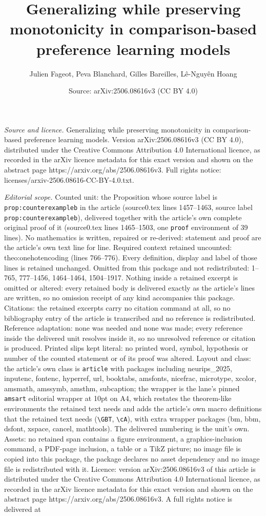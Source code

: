 \documentclass[10pt,a4paper]{amsart}
\title[Generalizing while preserving monotonicity in comparison-bas]{Generalizing while preserving monotonicity in comparison-based preference learning models}
\author{Julien Fageot, Peva Blanchard, Gilles Bareilles, L\^e-Nguy\^en Hoang}
\date{Source: arXiv:2506.08616v3 (CC BY 4.0)}
\begin{document}
\maketitle

\noindent\emph{Source and licence.} Generalizing while preserving monotonicity in comparison-based preference learning models. Version arXiv:2506.08616v3 (CC BY 4.0), distributed under the Creative Commons Attribution 4.0 International licence, as recorded in the arXiv licence metadata for this exact version and shown on the abstract page https://arxiv.org/abs/2506.08616v3. Full rights notice: licenses/arxiv-2506.08616-CC-BY-4.0.txt.\par\smallskip

\noindent\textit{Editorial scope.} Counted unit: the Proposition whose source label is \texttt{prop:counterexampleb} in the article (source0.tex lines 1457--1463, source label \texttt{prop:counterexampleb}), delivered together with the article's own complete original proof of it (source0.tex lines 1465--1503, one \texttt{proof} environment of 39 lines). No mathematics is written, repaired or re-derived: statement and proof are the article's own text line for line. Required context retained uncounted: theo:onehotencoding (lines 766--776). Every definition, display and label of those lines is retained unchanged. Omitted from this package and not redistributed: 1--765, 777--1456, 1464--1464, 1504--1917. Nothing inside a retained excerpt is omitted or altered: every retained body is delivered exactly as the article's lines are written, so no omission receipt of any kind accompanies this package. Citations: the retained excerpts carry no citation command at all, so no bibliography entry of the article is transcribed and no reference is redistributed. Reference adaptation: none was needed and none was made; every reference inside the delivered unit resolves inside it, so no unresolved reference or citation is produced. Printed slips kept literal: no printed word, symbol, hypothesis or number of the counted statement or of its proof was altered. Layout and class: the article's own class is \texttt{article} with packages including neurips\_2025, inputenc, fontenc, hyperref, url, booktabs, amsfonts, nicefrac, microtype, xcolor, amsmath, amssymb, amsthm, subcaption; the wrapper is the lane's pinned \texttt{amsart} editorial wrapper at 10pt on A4, which restates the theorem-like environments the retained text needs and adds the article's own macro definitions that the retained text needs (\texttt{\textbackslash GBT}, \texttt{\textbackslash cA}), with extra wrapper packages (bm, bbm, dsfont, xspace, cancel, mathtools). The delivered numbering is the unit's own. Assets: no retained span contains a figure environment, a graphics-inclusion command, a PDF-page inclusion, a table or a TikZ picture; no image file is copied into this package, the package declares no asset dependency and no image file is redistributed with it. Licence: version arXiv:2506.08616v3 of this article is distributed under the Creative Commons Attribution 4.0 International licence, as recorded in the arXiv licence metadata for this exact version and shown on the abstract page https://arxiv.org/abs/2506.08616v3. A full rights notice is delivered at 
\end{document}
